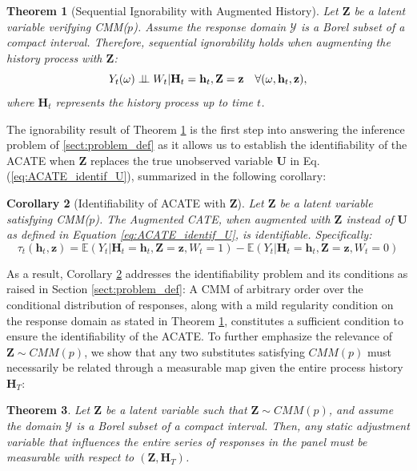 \documentclass[10pt]{article} %
\newtheorem{theorem}{Theorem}
\newtheorem{corollary}[theorem]{Corollary}
\begin{document}
\begin{theorem}[Sequential Ignorability with Augmented History]
\label{thm:seq_ign_augmented}
Let $\mathbf{Z}$ be a latent variable verifying CMM($p$). Assume the response domain $\mathcal{Y}$ is a Borel subset of a compact interval. Therefore, sequential ignorability holds when augmenting the history process with $\mathbf{Z}$: 
$$Y_{t}(\omega) \perp \!\!\! \perp  W_{t}| \mathbf{H}_{t} = \mathbf{h}_{t},\mathbf{Z}= \mathbf{z}\quad \forall (\omega,\mathbf{h}_{t},\mathbf{z}),$$
where $\mathbf{H}_{t}$ represents the history process up to time $t$. %
\end{theorem}
The ignorability result of Theorem \ref{thm:seq_ign_augmented} is the first step into answering the inference problem of \ref{sect:problem_def} as it allows us to establish the identifiability of the ACATE when $\mathbf{Z}$ replaces the true unobserved variable $\mathbf{U}$ in Eq. (\ref{eq:ACATE_identif_U}), summarized in the following corollary:
\begin{corollary}[Identifiability of ACATE with $\mathbf{Z}$]
\label{corollary:acate_identif} 
Let $\mathbf{Z}$ be a latent variable satisfying CMM($p$). The Augmented CATE, when augmented with $\mathbf{Z}$ instead of $\mathbf{U}$ as defined in Equation \ref{eq:ACATE_identif_U}, is identifiable. Specifically:
 \begin{equation}
 \label{eq:acate_identif}
 \tau_{t}(\mathbf{h}_{t}, \mathbf{z}) = \mathbb{E}(Y_{t}| \mathbf{H}_t = \mathbf{h}_t, \mathbf{Z}= \mathbf{z}, W_{t} = 1) - \mathbb{E}(Y_{t}| \mathbf{H}_t = \mathbf{h}_t, \mathbf{Z}= \mathbf{z}, W_{t} = 0) 
 \end{equation}
\end{corollary}
As a result, Corollary \ref{corollary:acate_identif} addresses the identifiability problem and its conditions as raised in Section \ref{sect:problem_def}: A CMM of arbitrary order over the conditional distribution of responses, along with a mild regularity condition on the response domain as stated in Theorem \ref{thm:seq_ign_augmented}, constitutes a sufficient condition to ensure the identifiability of the ACATE. To further emphasize the relevance of \(\mathbf{Z} \sim CMM(p)\), we show that any two substitutes satisfying \(CMM(p)\) must necessarily be related through a measurable map given the entire process history \(\mathbf{H}_T\):
\begin{theorem}
\label{thm:valid_Z} 
Let \(\mathbf{Z}\) be a latent variable such that \(\mathbf{Z} \sim CMM(p)\), and assume the domain \(\mathcal{Y}\) is a Borel subset of a compact interval. Then, any static adjustment variable that influences the entire series of responses in the panel must be measurable with respect to \((\mathbf{Z}, \mathbf{H}_T)\).
\end{theorem}
\end{document}

